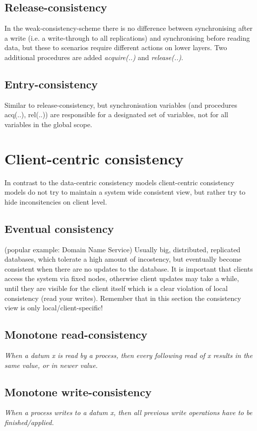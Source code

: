 \subsection{Release-consistency}
In the weak-consistency-scheme there is no difference between synchronising after a write (i.e. a write-through to all replications) and synchronising before reading data, but these to scenarios require different actions on lower layers.
Two additional procedures are added \emph{acquire(..)} and \emph{release(..)}.

\subsection{Entry-consistency}
Similar to release-consistency, but synchronisation variables (and procedures acq(..), rel(..)) are responsible for a designated set of variables, not for all variables in the global scope.

\section{Client-centric consistency}
In contrast to the data-centric consistency models client-centric consistency models do not try to maintain a system wide consistent view, but rather try to hide inconsitencies on client level.

\subsection{Eventual consistency}
(popular example: Domain Name Service)
Usually big, distributed, replicated databases, which tolerate a high amount of incostency, but eventually become consistent when there are no updates to the database.
It is important that clients access the system via fixed nodes, otherwise client updates may take a while, until they are visible for the client itself which is a clear violation of local consistency (read your writes).
Remember that in this section the consistency view is only local/client-specific!

\subsection{Monotone read-consistency}
\emph{When a datum x is read by a process, then every following read of x results in the same value, or in newer value.}

\subsection{Monotone write-consistency}
\emph{When a process writes to a datum x, then all previous write operations have to be finished/applied.}

